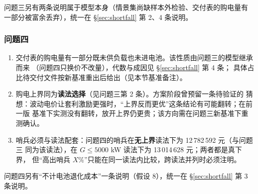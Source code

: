\documentclass[withoutpreface]{cumcmthesis}
\renewcommand{\emph}[1]{\textbf{#1}}
\begin{document}
\noindent 问题三另有两条说明属于模型本身（情景集尚缺样本外检验、交付表的购电量有
一部分被富余丢弃），统一在 \S\ref{sec:shortfall} 第 2、4 条说明。

\subsubsection{问题四}
\label{sec:q4lim}

\begin{enumerate}[itemsep=1pt, topsep=2pt]
  \item 交付表的购电量有一部分既未供负载也未进电池。该性质由问题三的模型继承而来
        （问题四只换价不改量），代数与成因见 \S\ref{sec:shortfall} 第 4 条；
        具体占比待交付文件按新基准重出后给出（见本节基准备注）。
  \item 购电上界同为\emph{读法选择}（见问题三第 2 条）。方案阶段曾预留一条待验证的
        猜想：波动电价让套利激励更强时，“上界反而更优”这条结论有可能翻转；在前一版
        基准下实测没有翻转，放开上界仍更贵；该方向需在问题三新基准下重测确认。
  \item 哨兵必须与读法配套：问题四的哨兵在\emph{无上界}读法下为 12\,782\,592 元（与问题三
        同为该读法），在 $G\le5000$ kW 读法下为 13\,014\,628 元；两者都是真下界，
        但“高出哨兵 $X\%$”只能在同一读法内比较，跨读法并列时必须注明。
\end{enumerate}

\noindent 问题四另有“不计电池退化成本”一条说明（假设 8），统一在
\S\ref{sec:shortfall} 第 3 条说明。
\end{document}
